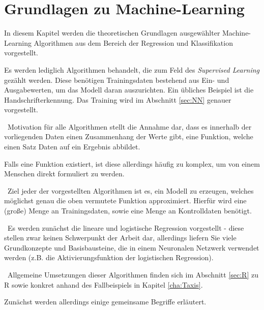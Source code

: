 \chapter{Grundlagen zu Machine-Learning}
\label{cha:MachineLearning}
\label{cha:Theorie}
In diesem Kapitel werden die theoretischen Grundlagen ausgewählter Machine-Learning Algorithmen aus dem Bereich der Regression und Klassifikation vorgestellt. 

Es werden lediglich Algorithmen behandelt, die zum Feld des \textit{Supervised Learning} gezählt werden. Diese benötigen Trainingsdaten bestehend aus Ein- und Ausgabewerten, um das Modell daran auszurichten. Ein übliches Beispiel ist die Handschrifterkennung. Das Training wird im Abschnitt \ref{sec:NN} genauer vorgestellt. 

~\newline Motivation für alle Algorithmen stellt die Annahme dar, dass es innerhalb der vorliegenden Daten einen Zusammenhang der Werte gibt, eine Funktion, welche einen Satz Daten auf ein Ergebnis abbildet. 

Falls eine Funktion existiert, ist diese allerdings häufig zu komplex, um von einem Menschen direkt formuliert zu werden.   

~\newline Ziel jeder der vorgestellten Algorithmen ist es, ein Modell zu erzeugen, welches möglichst genau die oben vermutete Funktion approximiert. Hierfür wird eine (große) Menge an Trainingsdaten, sowie eine Menge an Kontrolldaten benötigt.

~\newline Es werden zunächst die lineare und logistische Regression vorgestellt - diese stellen zwar keinen Schwerpunkt der Arbeit dar, allerdings liefern Sie viele Grundkonzepte und Basisbausteine, die in einem Neuronalen Netzwerk verwendet werden (z.B. die Aktivierungsfunktion der logistischen Regression).    

~\newline Allgemeine Umsetzungen dieser Algorithmen finden sich im Abschnitt \ref{sec:R} zu R sowie konkret anhand des Fallbeispiels in Kapitel \ref{cha:Taxis}. 

Zunächst werden allerdings einige gemeinsame Begriffe erläutert. 



